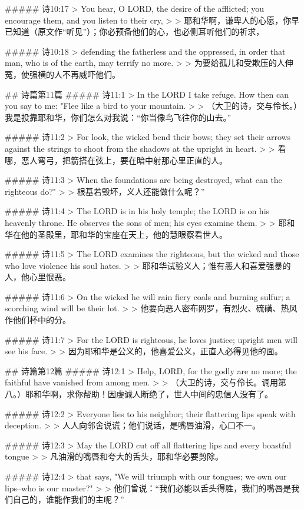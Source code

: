 ##### 诗10:17
> You hear, O LORD, the desire of the afflicted; you encourage them, and you listen to their cry,
>
> 耶和华啊，谦卑人的心愿，你早已知道（原文作“听见”）；你必预备他们的心，也必侧耳听他们的祈求，


##### 诗10:18
> defending the fatherless and the oppressed, in order that man, who is of the earth, may terrify no more.
>
> 为要给孤儿和受欺压的人伸冤，使强横的人不再威吓他们。


## 诗篇第11篇
##### 诗11:1
> In the LORD I take refuge. How then can you say to me: "Flee like a bird to your mountain.
>
> （大卫的诗，交与伶长。）我是投靠耶和华，你们怎么对我说：“你当像鸟飞往你的山去。”


##### 诗11:2
> For look, the wicked bend their bows; they set their arrows against the strings to shoot from the shadows at the upright in heart.
>
> 看哪，恶人弯弓，把箭搭在弦上，要在暗中射那心里正直的人。


##### 诗11:3
> When the foundations are being destroyed, what can the righteous do?"
>
> 根基若毁坏，义人还能做什么呢？”


##### 诗11:4
> The LORD is in his holy temple; the LORD is on his heavenly throne. He observes the sons of men; his eyes examine them.
>
> 耶和华在他的圣殿里，耶和华的宝座在天上，他的慧眼察看世人。


##### 诗11:5
> The LORD examines the righteous, but the wicked and those who love violence his soul hates.
>
> 耶和华试验义人；惟有恶人和喜爱强暴的人，他心里恨恶。


##### 诗11:6
> On the wicked he will rain fiery coals and burning sulfur; a scorching wind will be their lot.
>
> 他要向恶人密布网罗，有烈火、硫磺、热风作他们杯中的分。


##### 诗11:7
> For the LORD is righteous, he loves justice; upright men will see his face.
>
> 因为耶和华是公义的，他喜爱公义，正直人必得见他的面。


## 诗篇第12篇
##### 诗12:1
> Help, LORD, for the godly are no more; the faithful have vanished from among men.
>
> （大卫的诗，交与伶长。调用第八。）耶和华啊，求你帮助！因虔诚人断绝了，世人中间的忠信人没有了。


##### 诗12:2
> Everyone lies to his neighbor; their flattering lips speak with deception.
>
> 人人向邻舍说谎；他们说话，是嘴唇油滑，心口不一。


##### 诗12:3
> May the LORD cut off all flattering lips and every boastful tongue
>
> 凡油滑的嘴唇和夸大的舌头，耶和华必要剪除。


##### 诗12:4
> that says, "We will triumph with our tongues; we own our lips--who is our master?"
>
> 他们曾说：“我们必能以舌头得胜，我们的嘴唇是我们自己的，谁能作我们的主呢？”



